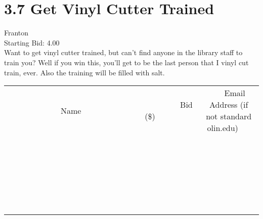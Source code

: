 \documentclass[11pt]{article}
\begin{document}
					\section*{3.7 Get Vinyl Cutter Trained}
					Franton \\
					Starting Bid: 4.00 \\
					Want to get vinyl cutter trained, but can't find anyone in the library staff to train you? Well if you win this, you'll get to be the last person that I vinyl cut train, ever. Also the training will be filled with salt. \\
					[6ex]
					\begin{tabular}{c c c}
						~~~~~~~~~~~~~Name~~~~~~~~~~~~~ & ~~~~~~~~~Bid (\$)~~~~~~~~~ & ~~~Email Address (if not standard olin.edu)~~~ \\
				
 & & \\
\hline
 & & \\
\hline
 & & \\
\hline
 & & \\
\hline
 & & \\
\hline
 & & \\
\hline
 & & \\
\hline
 & & \\
\hline
 & & \\
\hline
 & & \\
\hline
 & & \\
\hline
 & & \\
\hline
 & & \\
\hline
 & & \\
\hline
 & & \\
\hline
 & & \\
\hline
 & & \\
\hline
 & & \\
\hline
 & & \\
\hline
 & & \\
\hline
 & & \\
\hline
 & & \\
\hline
 & & \\
\hline
 & & \\
\hline
 & & \\
\hline
 & & \\
\hline
					\end{tabular}
					\clearpage
				
\end{document}
